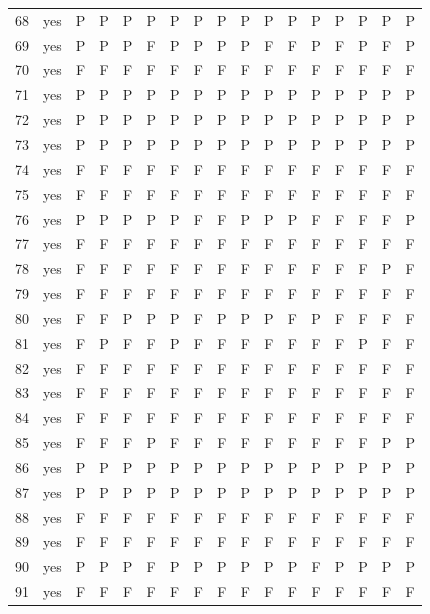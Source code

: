 \begin{table}[p]
\begin{tabular*}{\textwidth}{@{\extracolsep{\fill}}rcccccccccccccccc}
68 & yes & P & P & P & P & P & P & P & P & P & P & P & P & P & P & P\\
69 & yes & P & P & P & F & P & P & P & P & F & F & P & F & P & F & P\\
70 & yes & F & F & F & F & F & F & F & F & F & F & F & F & F & F & F\\
71 & yes & P & P & P & P & P & P & P & P & P & P & P & P & P & P & P\\
72 & yes & P & P & P & P & P & P & P & P & P & P & P & P & P & P & P\\
73 & yes & P & P & P & P & P & P & P & P & P & P & P & P & P & P & P\\
74 & yes & F & F & F & F & F & F & F & F & F & F & F & F & F & F & F\\
75 & yes & F & F & F & F & F & F & F & F & F & F & F & F & F & F & F\\
76 & yes & P & P & P & P & P & F & F & P & P & P & F & F & F & F & P\\
77 & yes & F & F & F & F & F & F & F & F & F & F & F & F & F & F & F\\
78 & yes & F & F & F & F & F & F & F & F & F & F & F & F & F & P & F\\
79 & yes & F & F & F & F & F & F & F & F & F & F & F & F & F & F & F\\
80 & yes & F & F & P & P & P & F & P & P & P & F & P & F & F & F & F\\
81 & yes & F & P & F & F & P & F & F & F & F & F & F & F & P & F & F\\
82 & yes & F & F & F & F & F & F & F & F & F & F & F & F & F & F & F\\
83 & yes & F & F & F & F & F & F & F & F & F & F & F & F & F & F & F\\
84 & yes & F & F & F & F & F & F & F & F & F & F & F & F & F & F & F\\
85 & yes & F & F & F & P & F & F & F & F & F & F & F & F & F & P & P\\
86 & yes & P & P & P & P & P & P & P & P & P & P & P & P & P & P & P\\
87 & yes & P & P & P & P & P & P & P & P & P & P & P & P & P & P & P\\
88 & yes & F & F & F & F & F & F & F & F & F & F & F & F & F & F & F\\
89 & yes & F & F & F & F & F & F & F & F & F & F & F & F & F & F & F\\
90 & yes & P & P & P & F & P & P & P & P & P & P & F & P & P & P & P\\
91 & yes & F & F & F & F & F & F & F & F & F & F & F & F & F & F & F\\
\bottomrule\end{tabular*}\end{table}
\clearpage

